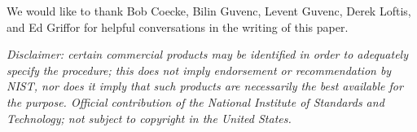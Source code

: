 \documentclass[sigconf]{acmart}
\begin{document}

\begin{acks}
We would like to thank Bob Coecke, Bilin Guvenc, Levent Guvenc, Derek Loftis, and Ed Griffor for helpful conversations in the writing of this paper.

\emph{Disclaimer: certain commercial products may be identified in order to adequately specify the procedure; this does not imply endorsement or recommendation by NIST, nor does it imply that such products are necessarily the best available for the purpose. Official contribution of the National Institute of Standards and Technology; not subject to copyright in the United States.}
\end{acks}

\balance %
%

 
\end{document}
